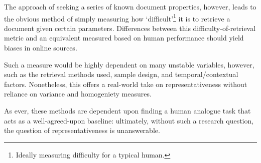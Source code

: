 The approach of seeking a series of known document properties, however, leads to the obvious method of simply measuring how `difficult'\footnote{Ideally measuring difficulty for a typical human.} it is to retrieve a document given certain parameters.  Differences between this difficulty-of-retrieval metric and an equivalent measured based on human performance should yield biases in online sources.

Such a measure would be highly dependent on many unstable variables, however, such as the retrieval methods used, sample design, and temporal/contextual factors.  Nonetheless, this offers a real-world take on representativeness without reliance on variance and homogeniety measures.

As ever, these methods are dependent upon finding a human analogue task that acts as a well-agreed-upon baseline: ultimately, without such a research question, the question of representativeness is unanswerable.


